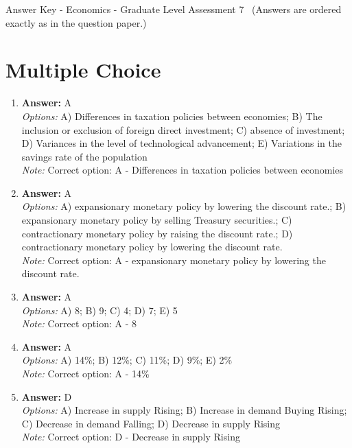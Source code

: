 \documentclass[12pt]{article}
\begin{document}
\begin{center}
Answer Key - Economics - Graduate Level Assessment 7 \
\small (Answers are ordered exactly as in the question paper.)
\end{center}

\section*{Multiple Choice}
\begin{enumerate}[label=\arabic*.]
\item \textbf{Answer:} A
\\ \textit{Options:} A) Differences in taxation policies between economies; B) The inclusion or exclusion of foreign direct investment; C) absence of investment; D) Variances in the level of technological advancement; E) Variations in the savings rate of the population
\\ \textit{Note:} Correct option: A - Differences in taxation policies between economies
\item \textbf{Answer:} A
\\ \textit{Options:} A) expansionary monetary policy by lowering the discount rate.; B) expansionary monetary policy by selling Treasury securities.; C) contractionary monetary policy by raising the discount rate.; D) contractionary monetary policy by lowering the discount rate.
\\ \textit{Note:} Correct option: A - expansionary monetary policy by lowering the discount rate.
\item \textbf{Answer:} A
\\ \textit{Options:} A) 8; B) 9; C) 4; D) 7; E) 5
\\ \textit{Note:} Correct option: A - 8
\item \textbf{Answer:} A
\\ \textit{Options:} A) 14\%; B) 12\%; C) 11\%; D) 9\%; E) 2\%
\\ \textit{Note:} Correct option: A - 14\%
\item \textbf{Answer:} D
\\ \textit{Options:} A) Increase in supply Rising; B) Increase in demand Buying Rising; C) Decrease in demand Falling; D) Decrease in supply Rising
\\ \textit{Note:} Correct option: D - Decrease in supply Rising
\end{enumerate}
\end{document}
